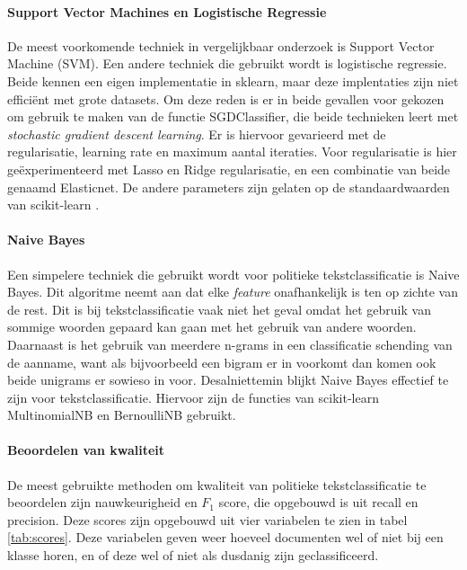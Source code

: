 \paragraph{Support Vector Machines en Logistische Regressie}
De meest voorkomende techniek in vergelijkbaar onderzoek is Support Vector Machine (SVM). Een andere techniek die gebruikt wordt is logistische regressie. Beide kennen een eigen implementatie in sklearn, maar deze implentaties zijn niet efficiënt met grote datasets. Om deze reden is er in beide gevallen voor gekozen om gebruik te maken van de functie SGDClassifier, die beide technieken leert met \textit{stochastic gradient descent learning}. Er is hiervoor gevarieerd met de regularisatie, learning rate en maximum aantal iteraties. Voor regularisatie is hier geëxperimenteerd met Lasso en Ridge regularisatie, en een combinatie van beide genaamd Elasticnet. De andere parameters zijn gelaten op de standaardwaarden van scikit-learn \cite{scikit-learn}.\par

\paragraph{Naive Bayes}
Een simpelere techniek die gebruikt wordt voor politieke tekstclassificatie is Naive Bayes. Dit algoritme neemt aan dat elke \textit{feature} onafhankelijk is ten op zichte van de rest. Dit is bij tekstclassificatie vaak niet het geval omdat het gebruik van sommige woorden gepaard kan gaan met het gebruik van andere woorden. Daarnaast is het gebruik van meerdere n-grams in een classificatie schending van de aanname, want als bijvoorbeeld een bigram er in voorkomt dan komen ook beide unigrams er sowieso in voor. Desalniettemin blijkt Naive Bayes effectief te zijn voor tekstclassificatie\cite{scikit-learn,bhand}. Hiervoor zijn de functies van scikit-learn MultinomialNB en BernoulliNB gebruikt.\cite{scikit-learn,bhand}\par

\paragraph{Beoordelen van kwaliteit}
De meest gebruikte methoden om kwaliteit van politieke tekstclassificatie te beoordelen zijn nauwkeurigheid en $F_1$ score, die opgebouwd is uit recall en precision. Deze scores zijn opgebouwd uit vier variabelen te zien in tabel \ref{tab:scores}. Deze variabelen geven weer hoeveel documenten wel of niet bij een klasse horen, en of deze wel of niet als dusdanig zijn geclassificeerd.\par

